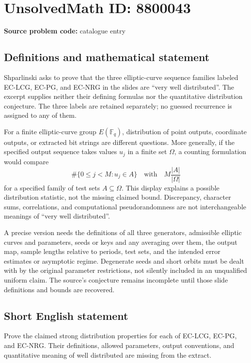 \documentclass[11pt]{article}
\newcommand{\F}{\mathbb{F}}
\begin{document}
\section*{UnsolvedMath ID: 8800043}
\textbf{Source problem code:} catalogue entry
\subsection{Definitions and mathematical statement}
Shparlinski asks to prove that the three elliptic-curve sequence families labeled EC-LCG, EC-PG, and EC-NRG in the slides are ``very well distributed''. The excerpt supplies neither their defining formulas nor the quantitative distribution conjecture. The three labels are retained separately; no guessed recurrence is assigned to any of them.

For a finite elliptic-curve group \(E(\F_q)\), distribution of point outputs, coordinate outputs, or extracted bit strings are different questions. More generally, if the specified output sequence takes values \(u_j\) in a finite set \(\Omega\), a counting formulation would compare
\[
 \#\{0\leq j<M:u_j\in A\}
 \quad\text{with}\quad M\frac{|A|}{|\Omega|}
\]
for a specified family of test sets \(A\subseteq\Omega\). This display explains a possible distribution statistic, not the missing claimed bound. Discrepancy, character sums, correlations, and computational pseudorandomness are not interchangeable meanings of ``very well distributed''.

A precise version needs the definitions of all three generators, admissible elliptic curves and parameters, seeds or keys and any averaging over them, the output map, sample lengths relative to periods, test sets, and the intended error estimates or asymptotic regime. Degenerate seeds and short orbits must be dealt with by the original parameter restrictions, not silently included in an unqualified uniform claim. The source's conjecture remains incomplete until those slide definitions and bounds are recovered.
\subsection{Short English statement}
Prove the claimed strong distribution properties for each of EC-LCG, EC-PG, and EC-NRG. Their definitions, allowed parameters, output conventions, and quantitative meaning of well distributed are missing from the extract.
\end{document}
